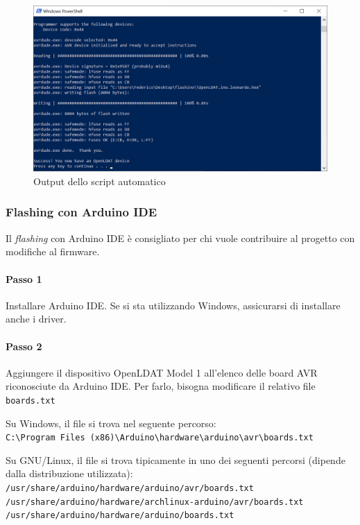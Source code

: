 \begin{figure}[H]
	\centering
	\includegraphics[width=\textwidth]{Dispositivo_files/flashing_08.png}
	\caption{Output dello script automatico}
	\label{fig:flashing_08}
\end{figure}

\subsubsection{Flashing con Arduino IDE}
Il \textit{flashing} con Arduino IDE è consigliato per chi vuole contribuire al progetto con modifiche al firmware.

\paragraph{Passo 1} Installare Arduino IDE. Se si sta utilizzando Windows, assicurarsi di installare anche i driver.

\paragraph{Passo 2} Aggiungere il dispositivo OpenLDAT Model 1 all'elenco delle board AVR riconosciute da Arduino IDE. Per farlo, bisogna modificare il relativo file \texttt{boards.txt}

Su Windows, il file si trova nel seguente percorso:\\
	\texttt{C:\textbackslash Program Files (x86)\textbackslash Arduino\textbackslash hardware\textbackslash arduino\textbackslash avr\textbackslash boards.txt}

Su GNU/Linux, il file si trova tipicamente in uno dei seguenti percorsi (dipende dalla distribuzione utilizzata):\\
	\texttt{/usr/share/arduino/hardware/arduino/avr/boards.txt}\\
	\texttt{/usr/share/arduino/hardware/archlinux-arduino/avr/boards.txt}\\
	\texttt{/usr/share/arduino/hardware/arduino/boards.txt}

